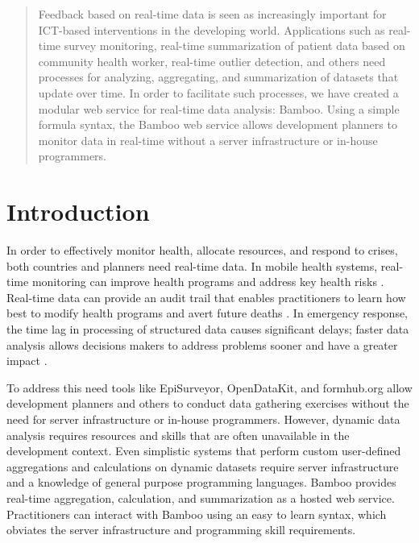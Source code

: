 \documentclass{acm_proc_article-sp}
\begin{document}
\maketitle
\begin{abstract}
Feedback based on real-time data is seen as increasingly important for ICT-based interventions in the developing world. Applications such as real-time survey monitoring, real-time summarization of patient data based on community health worker, real-time outlier detection, and others need processes for analyzing, aggregating, and summarization of datasets that update over time. In order to facilitate such processes, we have created a modular web service for real-time data analysis: Bamboo.  Using a simple formula syntax, the Bamboo web service allows development planners to monitor data in real-time without a server infrastructure or in-house programmers.
\end{abstract}




\section{Introduction}
In order to effectively monitor health, allocate resources, and respond to crises, both countries and planners need real-time data.  In mobile health systems, real-time monitoring can improve health programs and address key health risks \cite{mechael}.  Real-time data can provide an audit trail that enables practitioners to learn how best to modify health programs and avert future deaths \cite{krisberg}.  In emergency response, the time lag in processing of structured data causes significant delays; faster data analysis allows decisions makers to address problems sooner and have a greater impact \cite{internews}.

To address this need tools like EpiSurveyor, OpenDataKit, and formhub.org allow development planners and others to conduct data gathering exercises without the need for server infrastructure or in-house programmers.  However, dynamic data analysis requires resources and skills that are often unavailable in the development context.  Even simplistic systems that perform custom user-defined aggregations and calculations on dynamic datasets require server infrastructure and a knowledge of general purpose programming languages.  Bamboo provides real-time aggregation, calculation, and summarization as a hosted web service.  Practitioners can interact with Bamboo using an easy to learn syntax, which obviates the server infrastructure and programming skill requirements.  
\end{document}

